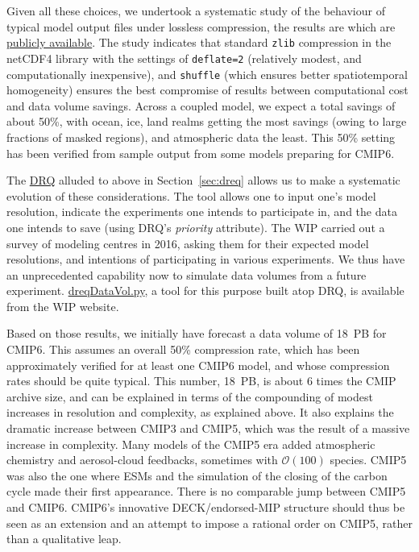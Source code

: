 \documentclass[gmd,manuscript]{copernicus}
\newcommand{\secref}[1] {\mbox{Section  \ref{sec:#1}}}
\begin{document}
\begin{enumerate}
  Given all these choices, we undertook a systematic study of the
  behaviour of typical model output files under lossless compression,
  the results are which are \href{https://goo.gl/qkdDnn}{publicly
    available}. The study indicates that standard \texttt{zlib}
  compression in the netCDF4 library with the settings of
  \texttt{deflate=2} (relatively modest, and computationally
  inexpensive), and \texttt{shuffle} (which ensures better
  spatiotemporal homogeneity) ensures the best compromise of results
  between computational cost and data volume savings. Across a coupled
  model, we expect a total savings of about 50\%, with ocean, ice,
  land realms getting the most savings (owing to large fractions of
  masked regions), and atmospheric data the least. This 50\% setting
  has been verified from sample output from some models preparing for
  CMIP6.
\end{enumerate}

The \href{https://goo.gl/iNBQ9m}{DRQ} alluded to above in
\secref{dreq} allows us to make a systematic evolution of these
considerations. The tool allows one to input one's model resolution,
indicate the experiments one intends to participate in, and the data
one intends to save (using DRQ's \emph{priority} attribute). The WIP
carried out a survey of modeling centres in 2016, asking them for
their expected model resolutions, and intentions of participating in
various experiments. We thus have an unprecedented capability now to
simulate data volumes from a future experiment.
\href{https://goo.gl/Ezz5v3}{dreqDataVol.py}, a tool for this purpose
built atop DRQ, is available from the WIP website.

Based on those results, we initially have forecast a data volume of
18~PB for CMIP6. This assumes an overall 50\% compression rate, which
has been approximately verified for at least one CMIP6 model, and
whose compression rates should be quite typical. This number, 18~PB,
is about 6 times the CMIP archive size, and can be explained in terms
of the compounding of modest increases in resolution and complexity,
as explained above. It also explains the dramatic increase between
CMIP3 and CMIP5, which was the result of a massive increase in
complexity. Many models of the CMIP5 era added atmospheric chemistry
and aerosol-cloud feedbacks, sometimes with $\mathcal{O}(100)$
species. CMIP5 was also the one where ESMs and the simulation of the
closing of the carbon cycle made their first appearance. There is no
comparable jump between CMIP5 and CMIP6. CMIP6's innovative
DECK/endorsed-MIP structure should thus be seen as an extension and an
attempt to impose a rational order on CMIP5, rather than a qualitative
leap.
\end{document}
